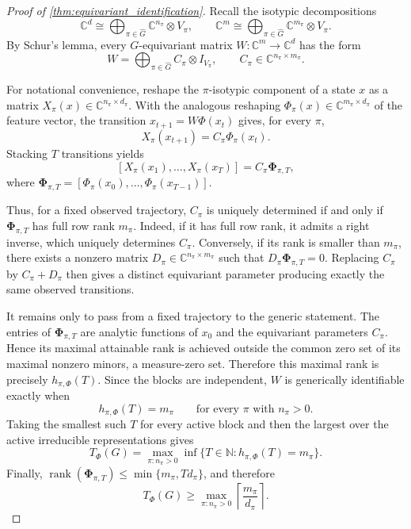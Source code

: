 \documentclass[11pt]{article}
\theoremstyle{plain}
\theoremstyle{definition}
\theoremstyle{remark}
\begin{document}
\begin{proof}[Proof of \cref{thm:equivariant_identification}]
Recall the isotypic decompositions
\[
\mathbb C^d\cong
\bigoplus_{\pi\in\widehat G}\mathbb C^{n_\pi}\otimes V_\pi,
\qquad
\mathbb C^m\cong
\bigoplus_{\pi\in\widehat G}\mathbb C^{m_\pi}\otimes V_\pi .
\]
By Schur's lemma, every \(G\)-equivariant matrix
\(W:\mathbb C^m\to\mathbb C^d\) has the form
\[
W=\bigoplus_{\pi\in\widehat G} C_\pi\otimes I_{V_\pi},
\qquad
C_\pi\in\mathbb C^{n_\pi\times m_\pi}.
\]

For notational convenience, reshape the \(\pi\)-isotypic component of a state
\(x\) as a matrix \(X_\pi(x)\in\mathbb C^{n_\pi\times d_\pi}\). With the
analogous reshaping
\(\Phi_\pi(x)\in\mathbb C^{m_\pi\times d_\pi}\) of the feature vector, the
transition \(x_{t+1}=W\Phi(x_t)\) gives, for every \(\pi\),
\[
X_\pi(x_{t+1})=C_\pi\Phi_\pi(x_t).
\]
Stacking \(T\) transitions yields
\[
[X_\pi(x_1),\ldots,X_\pi(x_T)]
=
C_\pi\mathbf{\Phi}_{\pi,T},
\]
where
\(\mathbf{\Phi}_{\pi,T}
=[\Phi_\pi(x_0),\ldots,\Phi_\pi(x_{T-1})]\).

Thus, for a fixed observed trajectory, \(C_\pi\) is uniquely determined if
and only if \(\mathbf{\Phi}_{\pi,T}\) has full row rank \(m_\pi\). Indeed, if
it has full row rank, it admits a right inverse, which uniquely determines
\(C_\pi\). Conversely, if its rank is smaller than \(m_\pi\), there exists a
nonzero matrix \(D_\pi\in\mathbb C^{n_\pi\times m_\pi}\) such that
\(D_\pi\mathbf{\Phi}_{\pi,T}=0\). Replacing \(C_\pi\) by
\(C_\pi+D_\pi\) then gives a distinct equivariant parameter producing exactly
the same observed transitions.

It remains only to pass from a fixed trajectory to the generic statement. The
entries of \(\mathbf{\Phi}_{\pi,T}\) are analytic functions of \(x_0\) and
the equivariant parameters \(C_\pi\). Hence its maximal attainable rank is
achieved outside the common zero set of its maximal nonzero minors, a
measure-zero set. Therefore this maximal rank is precisely
\(h_{\pi,\Phi}(T)\). Since the blocks are independent, \(W\) is generically
identifiable exactly when
\[
h_{\pi,\Phi}(T)=m_\pi
\qquad
\text{for every }\pi\text{ with }n_\pi>0.
\]
Taking the smallest such \(T\) for every active block and then the largest
over the active irreducible representations gives
\[
T_\Phi(G)=
\max_{\pi:n_\pi>0}
\inf\{T\in\mathbb N:h_{\pi,\Phi}(T)=m_\pi\}.
\]
Finally,
\(\operatorname{rank}(\mathbf{\Phi}_{\pi,T})
\le \min\{m_\pi,Td_\pi\}\), and therefore
\[
T_\Phi(G)\ge
\max_{\pi:n_\pi>0}
\left\lceil\frac{m_\pi}{d_\pi}\right\rceil .
\]
\end{proof}
\end{document}
